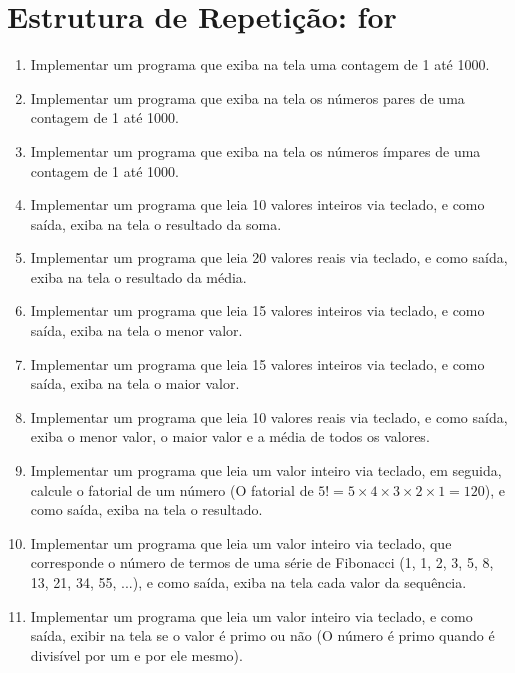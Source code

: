 \documentclass[11pt]{article}
\begin{document}
\newpage

\section{Estrutura de Repetição: for}

\begin{enumerate}
	\item  Implementar um programa que exiba na tela uma contagem de 1 até 1000.
	
	\item Implementar um programa que exiba na tela os números pares de uma contagem de 1 até 1000.
	
	\item Implementar um programa que exiba na tela os números ímpares de uma contagem de 1 até
	1000.
	
	\item Implementar um programa que leia 10 valores inteiros via teclado, e como saída, exiba na tela o
	resultado da soma.
	
	\item Implementar um programa que leia 20 valores reais via teclado, e como saída, exiba na tela o
	resultado da média.
	
	\item Implementar um programa que leia 15 valores inteiros via teclado, e como saída, exiba na tela o
	menor valor.
	
	\item  Implementar um programa que leia 15 valores inteiros via teclado, e como saída, exiba na tela o
	maior valor.
	
	\item Implementar um programa que leia 10 valores reais via teclado, e como saída, exiba o menor
	valor, o maior valor e a média de todos os valores.
	
	\item Implementar um programa que leia um valor inteiro via teclado, em seguida, calcule o fatorial de
	um número (O fatorial de $5! = 5 \times 4 \times 3 \times 2 \times 1 = 120$), e como saída, exiba na tela o resultado.
	
	\item  Implementar um programa que leia um valor inteiro via teclado, que corresponde o número de
	termos de uma série de Fibonacci (1, 1, 2, 3, 5, 8, 13, 21, 34, 55, ...), e como saída, exiba na tela
	cada valor da sequência.
	
	\item  Implementar um programa que leia um valor inteiro via teclado, e como saída, exibir na tela se
	o valor é primo ou não (O número é primo quando é divisível por um e por ele mesmo).
	

\end{enumerate}
\end{document}
